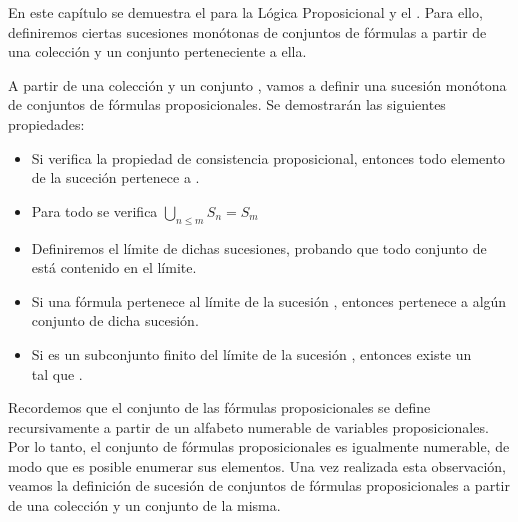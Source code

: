 %
\begin{isabellebody}%
%
%
\isadelimtheory
%
\endisadelimtheory
%
\isatagtheory
%
\endisatagtheory
{\isafoldtheory}%
%
\isadelimtheory
%
\endisadelimtheory
%
\begin{isamarkuptext}%
En este capítulo se demuestra el  para la Lógica 
  Proposicional y el . Para ello, definiremos ciertas sucesiones monótonas 
  de conjuntos de fórmulas a partir de una colección y un conjunto perteneciente a ella.%
\end{isamarkuptext}\isamarkuptrue%
%
\isadelimdocument
%
\endisadelimdocument
%
\isatagdocument
%
\isamarkuptrue%
%
\endisatagdocument
{\isafolddocument}%
%
\isadelimdocument
%
\endisadelimdocument
%
\begin{isamarkuptext}%
A partir de una colección  y un conjunto , vamos 
 a definir una sucesión monótona  de conjuntos de fórmulas
 proposicionales. Se demostrarán las siguientes propiedades:
  \begin{itemize}
   \item Si  verifica la propiedad de consistencia proposicional, 
   entonces todo elemento de la suceción  pertenece a . 
   \item Para todo  se verifica $\bigcup_{n \leq m} S_{n} = S_{m}$ 
   \item Definiremos el límite de dichas sucesiones, probando que todo 
    conjunto de  está contenido en el límite. 
  \item Si una fórmula pertenece al límite de la sucesión , 
   entonces pertenece a algún conjunto de dicha sucesión. 
  \item Si  es un subconjunto finito del límite de la sucesión , 
   entonces existe un\\  tal que .
\end{itemize}

  Recordemos que el conjunto de las fórmulas proposicionales se define recursivamente a partir 
  de un alfabeto numerable de variables proposicionales. Por lo tanto, el conjunto de fórmulas 
  proposicionales es igualmente numerable, de modo que es posible enumerar sus elementos. Una vez 
  realizada esta observación, veamos la definición de sucesión de conjuntos de fórmulas 
  proposicionales a partir de una colección y un conjunto de la misma.


\end{isamarkuptext}
\end{isabellebody}
